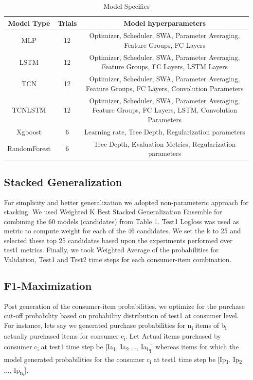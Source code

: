 \begin{table}[t]
\caption{ Model Specifics}
\vspace{0.1 in}
\centering
\resizebox{3.3in}{!}
{%
\begin{tabular}{|c|c|c|}
\hline
{\bf Model Type} & {\bf Trials} & {\bf Model hyperparameters} \\  \hline
MLP	  		&  12 & Optimizer, Scheduler, SWA, Parameter Averaging, Feature Groups, FC Layers \\ \hline
LSTM  		& 12 & Optimizer, Scheduler, SWA, Parameter Averaging, Feature Groups, FC Layers, LSTM Layers  \\ \hline
TCN			& 12	& Optimizer, Scheduler, SWA, Parameter Averaging, Feature Groups, FC Layers, Convolution Parameters  \\ \hline
TCNLSTM 		& 12	& Optimizer, Scheduler, SWA, Parameter Averaging, Feature Groups, FC Layers, LSTM, Convolution Parameters  \\ \hline
Xgboost 		& 6	& Learning rate, Tree Depth, Regularization parameters  \\ \hline
RandomForest 		& 6	& Tree Depth, Evaluation Metrics, Regularization parameters \\ \hline
\end{tabular}
}
\label{tab:models}
\end{table}

\subsection{Stacked Generalization}
For simplicity and better generalization we adopted non-parameteric approach for stacking.
We used Weighted K Best Stacked Generalization Ensemble for combining the 60 models (candidates) from Table 1. 
Test1 Logloss was used as metric to compute weight for each of the 46 candidates. We set the k to 25 and selected 
these top 25 candidates based upon the experiments performed over test1 metrics. Finally, we took Weighted Average of 
the probabilities for Validation, Test1 and Test2 time steps for each consumer-item combination.

\subsection{F1-Maximization}
Post generation of the consumer-item probabilities, we optimize for the purchase cut-off probability based on 
probability distribution of test1 at consumer level. For instance, lets say we generated purchase probabilities for 
n\textsubscript{i} items of b\textsubscript{i} actually purchased items for consumer c\textsubscript{i}.
Let Actual items purchased by consumer c\textsubscript{i} at test1 time step be [Ia\textsubscript{1}, Ia\textsubscript{2}
,.., Ia\textsubscript{b\textsubscript{i}}] whereas items for which the model generated probabilities for the 
consumer c\textsubscript{i} at test1 time step be [Ip\textsubscript{1}, Ip\textsubscript{2} ,.., 
Ip\textsubscript{n\textsubscript{i}}]. 

